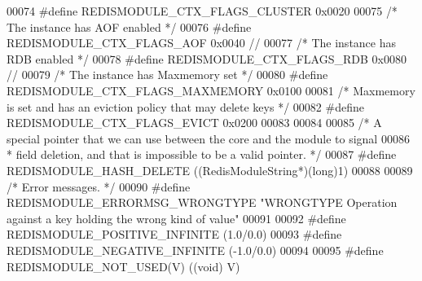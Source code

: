 \begin{DoxyCode}
00074 \textcolor{preprocessor}{#}\textcolor{preprocessor}{define} \textcolor{preprocessor}{REDISMODULE\_CTX\_FLAGS\_CLUSTER} 0x0020
00075 \textcolor{comment}{/* The instance has AOF enabled */}
00076 \textcolor{preprocessor}{#}\textcolor{preprocessor}{define} \textcolor{preprocessor}{REDISMODULE\_CTX\_FLAGS\_AOF} 0x0040 \textcolor{comment}{//}
00077 \textcolor{comment}{/* The instance has RDB enabled */}
00078 \textcolor{preprocessor}{#}\textcolor{preprocessor}{define} \textcolor{preprocessor}{REDISMODULE\_CTX\_FLAGS\_RDB} 0x0080 \textcolor{comment}{//}
00079 \textcolor{comment}{/* The instance has Maxmemory set */}
00080 \textcolor{preprocessor}{#}\textcolor{preprocessor}{define} \textcolor{preprocessor}{REDISMODULE\_CTX\_FLAGS\_MAXMEMORY} 0x0100
00081 \textcolor{comment}{/* Maxmemory is set and has an eviction policy that may delete keys */}
00082 \textcolor{preprocessor}{#}\textcolor{preprocessor}{define} \textcolor{preprocessor}{REDISMODULE\_CTX\_FLAGS\_EVICT} 0x0200
00083 
00084 
00085 \textcolor{comment}{/* A special pointer that we can use between the core and the module to signal}
00086 \textcolor{comment}{ * field deletion, and that is impossible to be a valid pointer. */}
00087 \textcolor{preprocessor}{#}\textcolor{preprocessor}{define} \textcolor{preprocessor}{REDISMODULE\_HASH\_DELETE} \textcolor{preprocessor}{(}\textcolor{preprocessor}{(}RedisModuleString\textcolor{preprocessor}{*}\textcolor{preprocessor}{)}\textcolor{preprocessor}{(}\textcolor{keywordtype}{long}\textcolor{preprocessor}{)}1\textcolor{preprocessor}{)}
00088 
00089 \textcolor{comment}{/* Error messages. */}
00090 \textcolor{preprocessor}{#}\textcolor{preprocessor}{define} \textcolor{preprocessor}{REDISMODULE\_ERRORMSG\_WRONGTYPE} \textcolor{stringliteral}{"WRONGTYPE Operation against a key holding the wrong kind of
       value"}
00091 
00092 \textcolor{preprocessor}{#}\textcolor{preprocessor}{define} \textcolor{preprocessor}{REDISMODULE\_POSITIVE\_INFINITE} \textcolor{preprocessor}{(}1.0\textcolor{preprocessor}{/}0.0\textcolor{preprocessor}{)}
00093 \textcolor{preprocessor}{#}\textcolor{preprocessor}{define} \textcolor{preprocessor}{REDISMODULE\_NEGATIVE\_INFINITE} \textcolor{preprocessor}{(}\textcolor{preprocessor}{-}1.0\textcolor{preprocessor}{/}0.0\textcolor{preprocessor}{)}
00094 
00095 \textcolor{preprocessor}{#}\textcolor{preprocessor}{define} \textcolor{preprocessor}{REDISMODULE\_NOT\_USED}\textcolor{preprocessor}{(}\textcolor{preprocessor}{V}\textcolor{preprocessor}{)} \textcolor{preprocessor}{(}\textcolor{preprocessor}{(}\textcolor{keywordtype}{void}\textcolor{preprocessor}{)} \textcolor{preprocessor}{V}\textcolor{preprocessor}{)}

\end{DoxyCode}

